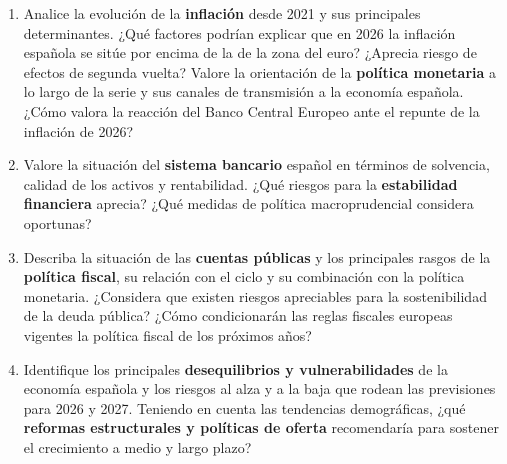 \documentclass[11pt,a4paper]{article}
\newenvironment{bloquecuadro}{\par\noindent\begingroup\scriptsize\setlength{\tabcolsep}{1.6pt}\renewcommand{\arraystretch}{1.08}}{\endgroup\par}
\begin{document}
\begin{enumerate}[leftmargin=1.8em, label=\textbf{\arabic*.}, itemsep=7pt]
\item Analice la evolución de la \textbf{inflación} desde 2021 y sus principales determinantes. ¿Qué factores podrían explicar que en 2026 la inflación española se sitúe por encima de la de la zona del euro? ¿Aprecia riesgo de efectos de segunda vuelta? Valore la orientación de la \textbf{política monetaria} a lo largo de la serie y sus canales de transmisión a la economía española. ¿Cómo valora la reacción del Banco Central Europeo ante el repunte de la inflación de 2026?
\item Valore la situación del \textbf{sistema bancario} español en términos de solvencia, calidad de los activos y rentabilidad. ¿Qué riesgos para la \textbf{estabilidad financiera} aprecia? ¿Qué medidas de política macroprudencial considera oportunas?
\item Describa la situación de las \textbf{cuentas públicas} y los principales rasgos de la \textbf{política fiscal}, su relación con el ciclo y su combinación con la política monetaria. ¿Considera que existen riesgos apreciables para la sostenibilidad de la deuda pública? ¿Cómo condicionarán las reglas fiscales europeas vigentes la política fiscal de los próximos años?
\item Identifique los principales \textbf{desequilibrios y vulnerabilidades} de la economía española y los riesgos al alza y a la baja que rodean las previsiones para 2026 y 2027. Teniendo en cuenta las tendencias demográficas, ¿qué \textbf{reformas estructurales y políticas de oferta} recomendaría para sostener el crecimiento a medio y largo plazo?
\end{enumerate}

\clearpage
\paperwidth=297mm \paperheight=210mm \pdfpagewidth=297mm \pdfpageheight=210mm
\fancyheadoffset{0pt}

\begin{bloquecuadro}\end{bloquecuadro}
\vspace{10pt}
\begin{bloquecuadro}\end{bloquecuadro}
\clearpage
\end{document}

